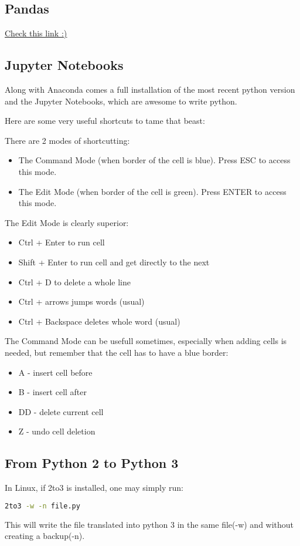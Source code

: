 \subsection{Pandas}
\href{https://towardsdatascience.com/pandas-tips-and-tricks-33bcc8a40bb9?gi=29663f5b3e5
}{\ul{Check this link :)}}



\subsection{Jupyter Notebooks}
\par Along with Anaconda comes a full installation of the most recent python version and the Jupyter Notebooks, which are awesome to write python.
\par Here are some very useful shortcuts to tame that beast:
\vspace{.5cm}

\begin{center}
    There are 2 modes of shortcutting: 
\begin{itemize}
    \item The Command Mode (when border of the cell is blue). Press ESC to 
    access this mode.
    \item The Edit Mode (when border of the cell is green). Press ENTER to access this mode.
\end{itemize}

The Edit Mode is clearly superior: 
\begin{itemize}
    \item Ctrl + Enter to run cell
    \item Shift + Enter to run cell and get directly to the next
    \item Ctrl + D to delete a whole line
    \item Ctrl + arrows jumps words (usual)
    \item Ctrl + Backspace deletes whole word (usual)
\end{itemize} 

The Command Mode can be usefull sometimes, especially when adding cells is needed, but remember that the cell has to have a blue border:
\begin{itemize}
    \item A - insert cell before
    \item B - insert cell after
    \item DD - delete current cell
    \item Z - undo cell deletion
\end{itemize}


\end{center}



\subsection{From Python 2 to Python 3}
In Linux, if 2to3 is installed, one may simply run:
\begin{lstlisting}[language=bash]
    2to3 -w -n file.py    
\end{lstlisting}
This will write the file translated into python 3 in the same file(-w) and without creating a backup(-n).

